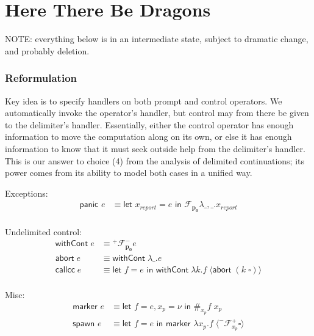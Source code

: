 \documentclass[11pt]{article}
\newcommand{\maybePage}{\newpage}
\newcommand\x{\lambda x}
\newcommand{\letin}[2]{\textsf{let }#1\textsf{ in }#2}
\newcommand\F{\mathcal{F}}
\newcommand{\angles}[1]{\langle#1\rangle}
\begin{document}
\maybePage
\part{Here There Be Dragons}

NOTE: everything below is in an intermediate state, subject to dramatic change, and probably deletion.



\section{Reformulation}

Key idea is to specify handlers on both prompt and control operators.
We automatically invoke the operator's handler, but control may from there be given to the delimiter's handler.
Essentially, either the control operator has enough information to move the computation along on its own, or else it has enough information to know that it must seek outside help from the delimiter's handler.
This is our answer to choice (4) from the analysis of delimited continuations; its power comes from its ability to model both cases in a unified way.


Exceptions:
\begin{align*}
\textsf{panic }e &\equiv
	\letin{x_{report} = e}{\F_\mathbf{p_0}\lambda \_,\_.x_{report}}
	\\
\end{align*}

Undelimited control:
\begin{align*}
\textsf{withCont}\;e &\equiv
	{}^+\F^-_\mathbf{p_0}e
	\\
\textsf{abort}\;e &\equiv
	\textsf{withCont}\;\lambda \_.e
	\\
\textsf{callcc}\;e &\equiv
	\letin{f=e}{\textsf{withCont}\;\lambda k. f\; \angles{\textsf{abort}\;(k\;\square)}}
	\\
\end{align*}

Misc:
\begin{align*}
\textsf{marker }e &\equiv
	\letin{f=e, x_p=\nu}{\#_{x_p}f\;x_p} \\
\textsf{spawn }e &\equiv
	\letin{f=e}{\textsf{marker }\x_p.f\;\angles{^-\F^+_{x_p}\square}}
	\\
\end{align*}
\end{document}
